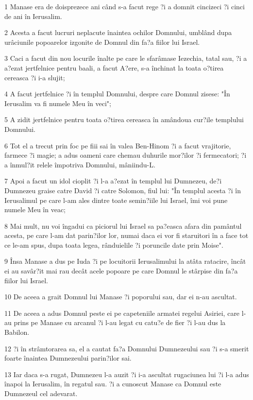 \par 1 Manase era de doisprezece ani când s-a facut rege ?i a domnit cincizeci ?i cinci de ani în Ierusalim.
\par 2 Acesta a facut lucruri neplacute înaintea ochilor Domnului, umblând dupa urâciunile popoarelor izgonite de Domnul din fa?a fiilor lui Israel.
\par 3 Caci a facut din nou locurile înalte pe care le sfarâmase Iezechia, tatal sau, ?i a a?ezat jertfelnice pentru baali, a facut A?ere, s-a închinat la toata o?tirea cereasca ?i i-a slujit;
\par 4 A facut jertfelnice ?i în templul Domnului, despre care Domnul zisese: "În Ierusalim va fi numele Meu în veci";
\par 5 A zidit jertfelnice pentru toata o?tirea cereasca în amândoua cur?ile templului Domnului.
\par 6 Tot el a trecut prin foc pe fiii sai în valea Ben-Hinom ?i a facut vrajitorie, farmece ?i magie; a adus oameni care chemau duhurile mor?ilor ?i fermecatori; ?i a înmul?it relele împotriva Domnului, mâniindu-L.
\par 7 Apoi a facut un idol cioplit ?i l-a a?ezat în templul lui Dumnezeu, de?i Dumnezeu graise catre David ?i catre Solomon, fiul lui: "În templul acesta ?i în Ierusalimul pe care l-am ales dintre toate semin?iile lui Israel, îmi voi pune numele Meu în veac;
\par 8 Mai mult, nu voi îngadui ca piciorul lui Israel sa pa?easca afara din pamântul acesta, pe care l-am dat parin?ilor lor, numai daca ei vor fi staruitori în a face tot ce le-am spus, dupa toata legea, rânduielile ?i poruncile date prin Moise".
\par 9 Însa Manase a dus pe Iuda ?i pe locuitorii Ierusalimului la atâta ratacire, încât ei au savâr?it mai rau decât acele popoare pe care Domnul le stârpise din fa?a fiilor lui Israel.
\par 10 De aceea a grait Domnul lui Manase ?i poporului sau, dar ei n-au ascultat.
\par 11 De aceea a adus Domnul peste ei pe capeteniile armatei regelui Asiriei, care l-au prins pe Manase cu arcanul ?i l-au legat cu catu?e de fier ?i l-au dus la Babilon.
\par 12 ?i în strâmtorarea sa, el a cautat fa?a Domnului Dumnezeului sau ?i s-a smerit foarte înaintea Dumnezeului parin?ilor sai.
\par 13 Iar daca s-a rugat, Dumnezeu l-a auzit ?i i-a ascultat rugaciunea lui ?i l-a adus înapoi la Ierusalim, în regatul sau. ?i a cunoscut Manase ca Domnul este Dumnezeul cel adevarat.
